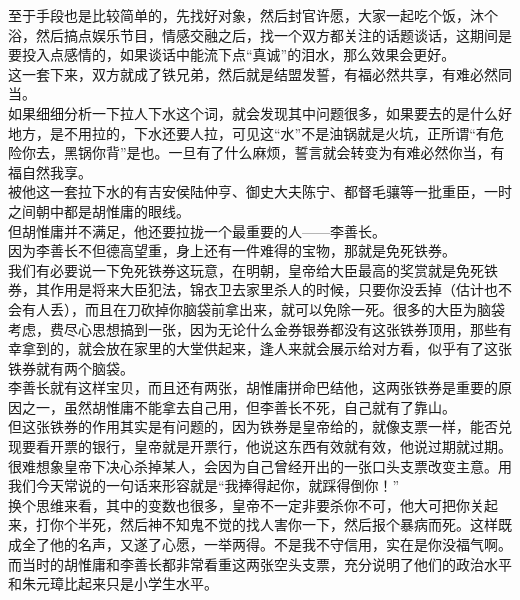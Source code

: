 \begin{multicols}{\theparacolNo}
至于手段也是比较简单的，先找好对象，然后封官许愿，大家一起吃个饭，沐个浴，然后搞点娱乐节目，情感交融之后，找一个双方都关注的话题谈话，这期间是要投入点感情的，如果谈话中能流下点“真诚”的泪水，那么效果会更好。\\

这一套下来，双方就成了铁兄弟，然后就是结盟发誓，有福必然共享，有难必然同当。\\

如果细细分析一下拉人下水这个词，就会发现其中问题很多，如果要去的是什么好地方，是不用拉的，下水还要人拉，可见这“水”不是油锅就是火坑，正所谓“有危险你去，黑锅你背”是也。一旦有了什么麻烦，誓言就会转变为有难必然你当，有福自然我享。\\

被他这一套拉下水的有吉安侯陆仲亨、御史大夫陈宁、都督毛骧等一批重臣，一时之间朝中都是胡惟庸的眼线。\\

但胡惟庸并不满足，他还要拉拢一个最重要的人——李善长。\\

因为李善长不但德高望重，身上还有一件难得的宝物，那就是免死铁券。\\

我们有必要说一下免死铁券这玩意，在明朝，皇帝给大臣最高的奖赏就是免死铁券，其作用是将来大臣犯法，锦衣卫去家里杀人的时候，只要你没丢掉（估计也不会有人丢），而且在刀砍掉你脑袋前拿出来，就可以免除一死。很多的大臣为脑袋考虑，费尽心思想搞到一张，因为无论什么金券银券都没有这张铁券顶用，那些有幸拿到的，就会放在家里的大堂供起来，逢人来就会展示给对方看，似乎有了这张铁券就有两个脑袋。\\

李善长就有这样宝贝，而且还有两张，胡惟庸拼命巴结他，这两张铁券是重要的原因之一，虽然胡惟庸不能拿去自己用，但李善长不死，自己就有了靠山。\\

但这张铁券的作用其实是有问题的，因为铁券是皇帝给的，就像支票一样，能否兑现要看开票的银行，皇帝就是开票行，他说这东西有效就有效，他说过期就过期。很难想象皇帝下决心杀掉某人，会因为自己曾经开出的一张口头支票改变主意。用我们今天常说的一句话来形容就是“我捧得起你，就踩得倒你！”\\

换个思维来看，其中的变数也很多，皇帝不一定非要杀你不可，他大可把你关起来，打你个半死，然后神不知鬼不觉的找人害你一下，然后报个暴病而死。这样既成全了他的名声，又遂了心愿，一举两得。不是我不守信用，实在是你没福气啊。\\

而当时的胡惟庸和李善长都非常看重这两张空头支票，充分说明了他们的政治水平和朱元璋比起来只是小学生水平。\\


\end{multicols}
